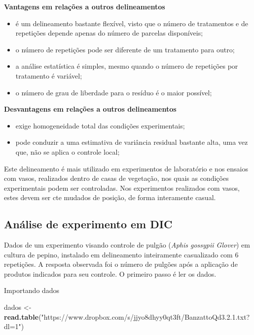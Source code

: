 \documentclass[
]{book}
\newenvironment{Shaded}{\begin{snugshade}}{\end{snugshade}}
\newcommand{\KeywordTok}[1]{\textcolor[rgb]{0.13,0.29,0.53}{\textbf{#1}}}
\newcommand{\NormalTok}[1]{#1}
\newcommand{\StringTok}[1]{\textcolor[rgb]{0.31,0.60,0.02}{#1}}
\providecommand{\tightlist}{%
  \setlength{\itemsep}{0pt}\setlength{\parskip}{0pt}}
\begin{document}
\textbf{Vantagens em relações a outros delineamentos}

\begin{itemize}
\tightlist
\item
  é um delineamento bastante flexível, visto que o número de tratamentos e de repetições depende apenas do número de parcelas disponíveis;
\item
  o número de repetições pode ser diferente de um tratamento para outro;
\item
  a análise estatística é simples, mesmo quando o número de repetições por tratamento é variável;
\item
  o número de grau de liberdade para o resíduo é o maior possível;
\end{itemize}

\textbf{Desvantagens em relações a outros delineamentos}

\begin{itemize}
\tightlist
\item
  exige homogeneidade total das condições experimentais;
\item
  pode conduzir a uma estimativa de variância residual bastante alta, uma vez que, não se aplica o controle local;
\end{itemize}

Este delineamento é mais utilizado em experimentos de laboratório e nos ensaios com vasos, realizados dentro de casas de vegetação, nos quais as condições experimentais podem ser controladas. Nos experimentos realizados com vasos, estes devem ser cte mudados de posição, de forma interamente casual.

\hypertarget{anuxe1lise-de-experimento-em-dic}{%
\subsection{Análise de experimento em DIC}\label{anuxe1lise-de-experimento-em-dic}}

Dados de um experimento visando controle de pulgão (\emph{Aphis gossypii Glover}) em cultura de pepino, instalado em delineamento inteiramente casualizado com 6 repetições. A resposta observada foi o número de pulgões após a aplicação de produtos indicados para seu controle.
O primeiro passo é ler os dados.

Importando dados

\begin{Shaded}
\begin{Highlighting}[]
\NormalTok{dados <-}\StringTok{ }\KeywordTok{read.table}\NormalTok{(}\StringTok{"https://www.dropbox.com/s/jjyo8dhyy0qt3ft/BanzattoQd3.2.1.txt?dl=1"}\NormalTok{) }
\end{Highlighting}
\end{Shaded}
\end{document}
